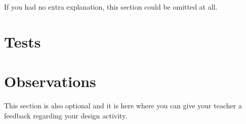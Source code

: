 If you had no extra explanation, this section could be omitted at all. 


\section{Tests}


\section{Observations}

This section is also optional and it is here where you can give your teacher a feedback regarding your design activity.


